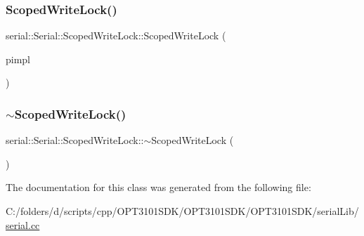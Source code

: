 \subsubsection{\texorpdfstring{Scoped\+Write\+Lock()}{ScopedWriteLock()}}
{\footnotesize\ttfamily serial\+::\+Serial\+::\+Scoped\+Write\+Lock\+::\+Scoped\+Write\+Lock (\begin{DoxyParamCaption}\item[{Serial\+Impl $\ast$}]{pimpl }\end{DoxyParamCaption})\hspace{0.3cm}{\ttfamily [inline]}}

\mbox{\label{class_serial_1_1_scoped_write_lock_aebeef5b2d16f409b60094cfac092ada2}} 
\subsubsection{\texorpdfstring{$\sim$\+Scoped\+Write\+Lock()}{~ScopedWriteLock()}}
{\footnotesize\ttfamily serial\+::\+Serial\+::\+Scoped\+Write\+Lock\+::$\sim$\+Scoped\+Write\+Lock (\begin{DoxyParamCaption}{ }\end{DoxyParamCaption})\hspace{0.3cm}{\ttfamily [inline]}}



The documentation for this class was generated from the following file\+:\begin{DoxyCompactItemize}
\item 
C\+:/folders/d/scripts/cpp/\+O\+P\+T3101\+S\+D\+K/\+O\+P\+T3101\+S\+D\+K/\+O\+P\+T3101\+S\+D\+K/serial\+Lib/\mbox{\hyperlink{serial_8cc}{serial.\+cc}}\end{DoxyCompactItemize}

